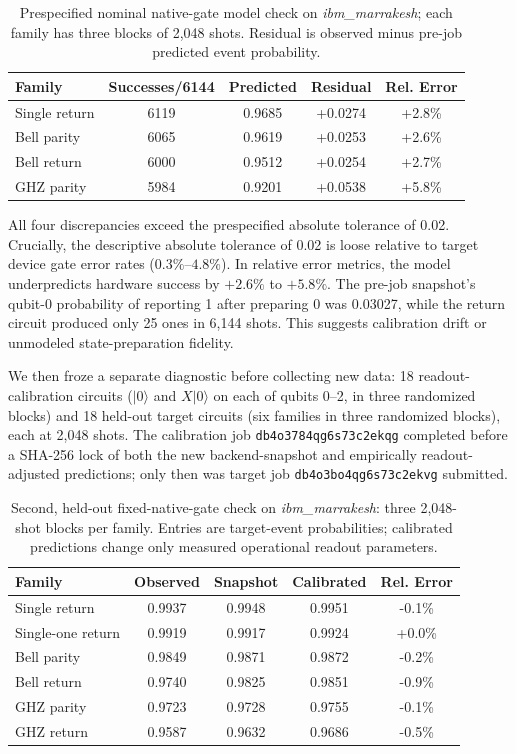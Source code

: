 \documentclass[10pt,letterpaper,journal]{IEEEtran}
\begin{document}
\begin{table}[t]
\centering\small\setlength{\tabcolsep}{2.5pt}\caption{Prespecified nominal native-gate model check on \emph{ibm\_marrakesh}; each family has three blocks of 2,048 shots. Residual is observed minus pre-job predicted event probability.}\label{tab:hardware_model}
\begin{tabular}{lcccc}\hline
Family & Successes/6144 & Predicted & Residual & Rel. Error\\\hline
Single return & 6119 & 0.9685 & +0.0274 & +2.8\%\\
Bell parity & 6065 & 0.9619 & +0.0253 & +2.6\%\\
Bell return & 6000 & 0.9512 & +0.0254 & +2.7\%\\
GHZ parity & 5984 & 0.9201 & +0.0538 & +5.8\%\\\hline
\end{tabular}
\end{table}

All four discrepancies exceed the prespecified absolute tolerance of 0.02. Crucially, the descriptive absolute tolerance of 0.02 is loose relative to target device gate error rates ($0.3\%\text{--}4.8\%$). In relative error metrics, the model underpredicts hardware success by $+2.6\%$ to $+5.8\%$. The pre-job snapshot's qubit-0 probability of reporting 1 after preparing 0 was 0.03027, while the return circuit produced only 25 ones in 6,144 shots. This suggests calibration drift or unmodeled state-preparation fidelity.

We then froze a separate diagnostic before collecting new data: 18 readout-calibration circuits ($|0\rangle$ and $X|0\rangle$ on each of qubits 0--2, in three randomized blocks) and 18 held-out target circuits (six families in three randomized blocks), each at 2,048 shots. The calibration job \texttt{db4o3784qg6s73c2ekqg} completed before a SHA-256 lock of both the new backend-snapshot and empirically readout-adjusted predictions; only then was target job \texttt{db4o3bo4qg6s73c2ekvg} submitted.

\begin{table}[t]
\centering\small\setlength{\tabcolsep}{2.5pt}\caption{Second, held-out fixed-native-gate check on \emph{ibm\_marrakesh}: three 2,048-shot blocks per family. Entries are target-event probabilities; calibrated predictions change only measured operational readout parameters.}\label{tab:hardware_readout}
\begin{tabular}{lcccc}\hline
Family & Observed & Snapshot & Calibrated & Rel. Error\\\hline
Single return & 0.9937 & 0.9948 & 0.9951 & -0.1\%\\
Single-one return & 0.9919 & 0.9917 & 0.9924 & +0.0\%\\
Bell parity & 0.9849 & 0.9871 & 0.9872 & -0.2\%\\
Bell return & 0.9740 & 0.9825 & 0.9851 & -0.9\%\\
GHZ parity & 0.9723 & 0.9728 & 0.9755 & -0.1\%\\
GHZ return & 0.9587 & 0.9632 & 0.9686 & -0.5\%\\\hline
\end{tabular}
\end{table}
\end{document}
